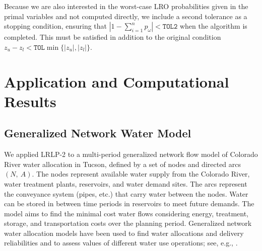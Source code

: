 \documentclass[11pt]{article}
\begin{document}
Because we are also interested in the worst-case LRO probabilities given in the primal variables and not computed directly, we include a second tolerance as a stopping condition, ensuring that $\left| 1 - \sum_{i=1}^n p_\omega \right| < \texttt{TOL2}$ when the algorithm is completed.
This must be satisfied in addition to the original condition $z_u - z_l < \texttt{TOL}\min\{|z_u|,|z_l|\}$.

\section{Application and Computational Results} \label{sec:comp_results}

\subsection{Generalized Network Water Model} 
\label{ssec:network_model}

We applied LRLP-2 to a multi-period generalized network flow model of Colorado River water allocation in Tucson, defined by a set of nodes and directed arcs $(N,\: A)$.
The nodes represent available water supply from the Colorado River, water treatment plants, reservoirs, and water demand sites.
The arcs represent the conveyance system (pipes, etc.) that carry water between the nodes. 
Water can be stored in between time periods in reservoirs to meet future demands. 
The model aims to find the minimal cost water flows considering energy, treatment, storage, and transportation costs over the planning period. 
Generalized network water allocation models have been used to find water allocations and delivery reliabilities and to assess values of different water use operations; see, e.g., \cite{draper_etal_03}. 
\end{document}
